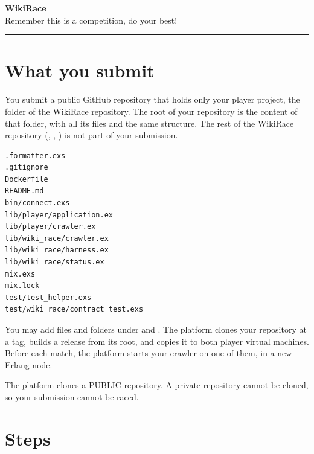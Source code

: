 \documentclass{article}
\begin{document}
\begin{center}
    {\LARGE \textbf{WikiRace}}\\[0.15cm]
    {\large Remember this is a competition, do your best!}\\[0.35cm]
    \rule{0.35\linewidth}{0.4pt}
\end{center}

\bigskip

\section{What you submit}

You submit a public GitHub repository that holds only your player project, the folder
 of the WikiRace repository. The root of your repository is the content of
that folder, with all its files and the same structure. The rest of the WikiRace
repository (, , ) is not part of your
submission.

\begin{lstlisting}[style=shell]
.formatter.exs
.gitignore
Dockerfile
README.md
bin/connect.exs
lib/player/application.ex
lib/player/crawler.ex
lib/wiki_race/crawler.ex
lib/wiki_race/harness.ex
lib/wiki_race/status.ex
mix.exs
mix.lock
test/test_helper.exs
test/wiki_race/contract_test.exs
\end{lstlisting}

You may add files and folders under  and . The platform clones
your repository at a tag, builds a release from its root, and copies it to both player
virtual machines. Before each match, the platform starts your crawler on one of them, in a
new Erlang node.

The platform clones a PUBLIC repository. A private repository cannot be cloned, so your
submission cannot be raced.

\section{Steps}
\end{document}
